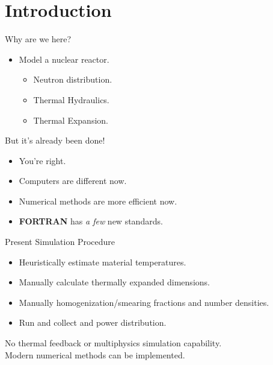 \section{Introduction}
\label{sec:introduction}

\begin{frame}{Why are we here?}
  \begin{itemize}
    \item {\huge Model a nuclear reactor.}
      \pause
      \begin{itemize}
        \item Neutron distribution.
        \item Thermal Hydraulics.
        \item Thermal Expansion.
      \end{itemize}
  \end{itemize}
\end{frame}

\begin{frame}{But it's already been done!}
  \begin{itemize}
    \pause 
    \item You're right.
    \pause
    \item Computers are different now.
    \item Numerical methods are more efficient now.
    \item \textbf{FORTRAN} has \textit{a few} new standards.
  \end{itemize}
\end{frame}

\begin{frame}{Present Simulation Procedure}
  \begin{itemize}
    \item Heuristically estimate material temperatures.
    \item Manually calculate thermally expanded dimensions.
    \item Manually homogenization/smearing fractions and number densities.
    \item Run \dif and collect \keff and power distribution.
    \pause
  \end{itemize}
  \vspace{0.3in}
  \begin{block}{}
    \centering
    No thermal feedback or multiphysics simulation capability.\\
    Modern numerical methods can be implemented.
  \end{block}
\end{frame}

